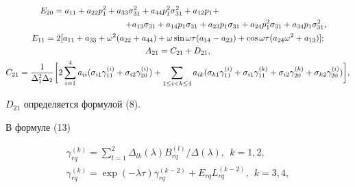 \begin{gather} 


E_{20}=a_{11}+a_{22}p^2_1+a_{33}\sigma^2_{31}+ 


a_{44}p^2_1\sigma^2_{31}+a_{12}p_1+\notag\hspace{40mm} \\ 


\hspace{40mm}+a_{13}\sigma_{31}+a_{14}p_1\sigma_{31}+ 


a_{23}p_1\sigma_{31}+a_{24}p^2_1\sigma_{31}+ 


a_{34}p_1\sigma^2_{31}, \\ 


E_{11}=2[a_{11}+a_{33}+\omega^2(a_{22}+a_{44})+ 


\omega\sin\omega\tau(a_{14}-a_{23})+


\cos\omega\tau(a_{24}\omega^2+a_{13})]; \\ 


% 


A_{21}=C_{21}+D_{21}, \\ 


%


C_{21}=\frac{1}{\Delta^2_1\Delta_2}\bigg[2\sum^4_{i=1} 


a_{ii}(\sigma_{i1}\gamma^{(i)}_{11}+ 


\sigma_{i2}\gamma^{(i)}_{20})+ 


\sum_{1\le i<k\le 4}a_{ik}(\sigma_{k1}\gamma^{(i)}_{11}+ 


\sigma_{i1}\gamma^{(k)}_{11}+\sigma_{i2}\gamma^{(k)}_{20}+ 


\sigma_{k2}\gamma^{(i)}_{20})\bigg], 


\end{gather} 


$D_{21}$ определяется формулой (8). 


 


В формуле (13) 


\begin{equation} 


\begin{array}{c} 


\gamma^{(k)}_{rq}=\displaystyle\sum^2_{l=1} 


\Delta_{lk}(\lambda)B^{(l)}_{rq}/\Delta(\lambda), 


\ \ k=1,2, \\[3mm] 


\gamma^{(k)}_{rq}=\exp(-\lambda\tau)\gamma^{(k-2)}_{rq}+ 


E_{rq}L^{(k-2)}_{rq},\ \ k=3,4, 


\end{array} 


\end{equation} 


